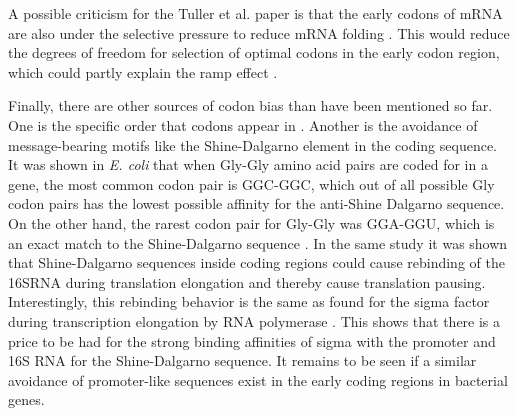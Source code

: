 A possible criticism for the Tuller et al. paper is that the early codons of
mRNA are also under the selective pressure to reduce mRNA folding
\cite{gu_universal_2010}. This would reduce the degrees of freedom for
selection of optimal codons in the early codon region, which could partly
explain the ramp effect \cite{plotkin_synonymous_2011}.

Finally, there are other sources of codon bias than have been mentioned so far.
One is the specific order that codons appear in \cite{cannarozzi_role_2010}.
Another is the avoidance of message-bearing motifs like the Shine-Dalgarno
element in the coding sequence.  It was shown in \textit{E. coli} that when
Gly-Gly amino acid pairs are coded for in a gene, the most common codon pair is
GGC-GGC, which out of all possible Gly codon pairs has the lowest possible
affinity for the anti-Shine Dalgarno sequence. On the other hand, the rarest
codon pair for Gly-Gly was GGA-GGU, which is an exact match to the
Shine-Dalgarno sequence \cite{li_anti-shine-dalgarno_2012}. In the same study
it was shown that Shine-Dalgarno sequences inside coding regions could cause
rebinding of the 16SRNA during translation elongation and thereby cause
translation pausing.  Interestingly, this rebinding behavior is the same as
found for the sigma factor during transcription elongation by RNA polymerase
\cite{mooney_sigma_2005}. This shows that there is a price to be had for the
strong binding affinities of sigma with the promoter and 16S RNA for the
Shine-Dalgarno sequence. It remains to be seen if a similar avoidance of
promoter-like sequences exist in the early coding regions in bacterial genes.
